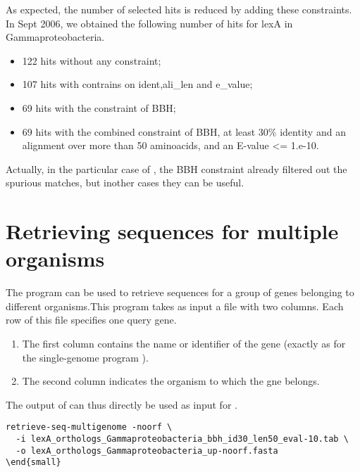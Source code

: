 As expected, the number of selected hits is reduced by adding these
constraints. In Sept 2006, we obtained the following number of hits
for lexA in Gammaproteobacteria.

\begin{itemize}
\item 122 hits without any constraint;
\item 107 hits with contrains on ident,ali\_len and e\_value;
\item 69 hits with the constraint of BBH;
\item 69 hits with the combined constraint of BBH, at least 30\%
  identity and an alignment over more than 50 aminoacids, and an
  E-value <= 1.e-10.
\end{itemize}

Actually, in the particular case of , the BBH constraint
already filtered out the spurious matches, but inother cases they can
be useful.

\section{Retrieving sequences for multiple organisms}

The program  can be used to retrieve
sequences for a group of genes belonging to different organisms.This
program takes as input a file with two columns. Each row of this file
specifies one query gene.

\begin{enumerate}

\item The first column contains the name or identifier of the gene
  (exactly as for the single-genome program ).

\item The second column indicates the organism to which the gne belongs.

\end{enumerate}

The output of  can thus directly be used as
input for .

\begin{small}
\begin{verbatim}
retrieve-seq-multigenome -noorf \
  -i lexA_orthologs_Gammaproteobacteria_bbh_id30_len50_eval-10.tab \
  -o lexA_orthologs_Gammaproteobacteria_up-noorf.fasta
\end{small}
\end{verbatim}
\end{small}

